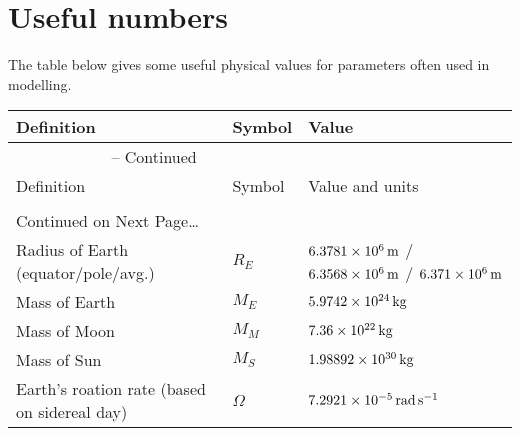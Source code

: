\chapter{Useful numbers}

The table below gives some useful physical values for parameters often used in modelling.

\begin{center}
\begin{longtable}{lll}
\hline\hline
Definition & Symbol & Value\\
\hline\hline
\endfirsthead
%
\multicolumn{2}{c}{{\tablename} -- Continued} \\[0.5ex]
\hline\hline
Definition & Symbol & Value and units\\
\hline\hline
\endhead
  \\[0.5ex]
  \multicolumn{2}{l}{{Continued on Next Page\ldots}} \\
\endfoot
  \hline
\endlastfoot
%
Radius of Earth (equator/pole/avg.)                    &  $R_E$        &  $\m[6.3781\times 10^6]$ / $\m[6.3568\times 10^6]$ / $\m[6.371\times 10^6]$\\
Mass of Earth                                   &  $M_E$        &  $\kg[5.9742\times 10^{24}]$\\
Mass of Moon                                    &  $M_M$        &  $\kg[7.36\times 10^{22}]$\\
Mass of Sun                                     &  $M_S$        &  $\kg[1.98892\times 10^{30}]$\\
Earth's roation rate (based on sidereal day)    &  $\Omega$     &  $\rads[7.2921\times 10^{-5}]$\\
\end{longtable}
\end{center}
